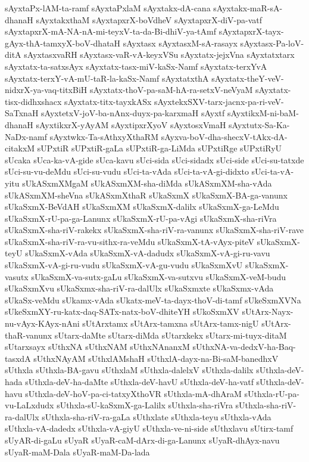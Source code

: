 {sAyxtaPx-lAM-ta-ramf
sAyxtaPxlaM
sAyxtakx-dA-cana
sAyxtakx-maR-sA-dhanaH
sAyxtakxthaM
sAyxtapxrX-boVdheV
sAyxtapxrX-diV-pa-vatf
sAyxtapxrX-mA-NA-nA-mi-teyxV-ta-da-Bi-dhiV-ya-tAmf
sAyxtapxrX-tayx-gAyx-thA-tamxyX-boV-dhataH
sAyxtasx
sAyxtasxM-sA-rasayx
sAyxtasx-Pa-loV-ditA
sAyxtasxvaRH
sAyxtasx-vaR-vA-keyxVSu
sAyxtatx-jejxVna
sAyxtatxtarx
sAyxtatx-ta-satxsAyx
sAyxtatx-tasx-miV-kaSx-Namf
sAyxtatx-terxYvA
sAyxtatx-terxY-vA-mU-taR-la-kaSx-Namf
sAyxtatxthA
sAyxtatx-theY-veV-nidxrX-ya-vaq-titxBiH
sAyxtatx-thoV-pa-saM-hA-ra-setxV-neVyaM
sAyxtatx-tisx-didhxshacx
sAyxtatx-titx-tayxkASx
sAyxtekxSXV-tarx-jacnx-pa-ri-veV-SaTxnaH
sAyxtetxV-joV-ba-nAnx-duyx-pa-karxmaH
sAyxtf
sAyxtikxM-ni-baM-dhanaH
sAyxtikxrX-yAyAM
sAyxtipxrXyoV
sAyxtosxVmaH
sAyxtutx-Sa-Ka-NaDx-namf
sAyxtwkx-Ta-sAthxyXthaRM
sAyxva-boV-dha-shecxV-tAkx-dA-citakxM
sUPxtiR
sUPxtiR-gaLa
sUPxtiR-ga-LiMda
sUPxtiRge
sUPxtiRyU
sUcaka
sUca-ka-vA-gide
sUca-kavu
sUci-sida
sUci-sidadx
sUci-side
sUci-su-tatxde
sUci-su-vu-deMdu
sUci-su-vudu
sUci-ta-vAda
sUci-ta-vA-gi-didxto
sUci-ta-vA-yitu
sUkASxmXMgaM
sUkASxmXM-sha-diMda
sUkASxmXM-sha-vAda
sUkASxmXM-sheVna
sUkASxmXthaR
sUkaSxmX
sUkaSxmX-BA-ga-vanunx
sUkaSxmX-BeVdAH
sUkaSxmXM
sUkaSxmX-dalilx
sUkaSxmX-ga-LeMdu
sUkaSxmX-rU-pa-ga-Lanunx
sUkaSxmX-rU-pa-vAgi
sUkaSxmX-sha-riVra
sUkaSxmX-sha-riV-rakekx
sUkaSxmX-sha-riV-ra-vanunx
sUkaSxmX-sha-riV-rave
sUkaSxmX-sha-riV-ra-vu-sithx-ra-veMdu
sUkaSxmX-tA-vAyx-piteV
sUkaSxmX-teyU
sUkaSxmX-vAda
sUkaSxmX-vA-dadudx
sUkaSxmX-vA-gi-ru-vavu
sUkaSxmX-vA-gi-ru-vudu
sUkaSxmX-vA-gu-vudu
sUkaSxmXvU
sUkaSxmX-vasutx
sUkaSxmX-va-sutx-gaLu
sUkaSxmX-va-sutxvu
sUkaSxmX-veM-budu
sUkaSxmXvu
sUkaSxmx-sha-riV-ra-dalUlx
sUkaSxmxte
sUkaSxmx-vAda
sUkaSx-veMdu
sUkamx-vAda
sUkatx-meV-ta-dayx-thoV-di-tamf
sUkeSxmXVNa
sUkeSxmXY-ru-katx-daq-SATx-natx-boV-dhiteYH
sUkoSxmXV
sUtArx-Nayx-nu-vAyx-KAyx-nAni
sUtArxtamx
sUtArx-tamxna
sUtArx-tamx-nigU
sUtArx-thaR-vanunx
sUtarx-daMte
sUtarx-diMda
sUtarxkekx
sUtarx-mi-tuyx-ditaM
sUtarxsayx
sUthxNA
sUthxNAM
sUthxNAnanxM
sUthxNA-va-dedxV-ha-Baq-tasxdA
sUthxNAyAM
sUthxlAMshaH
sUthxlA-dayx-na-Bi-saM-banedhxV
sUthxla
sUthxla-BA-gavu
sUthxlaM
sUthxla-dalelxV
sUthxla-dalilx
sUthxla-deV-hada
sUthxla-deV-ha-daMte
sUthxla-deV-havU
sUthxla-deV-ha-vatf
sUthxla-deV-havu
sUthxla-deV-hoV-pa-ci-tatxyXthoVR
sUthxla-mA-dhAraM
sUthxla-rU-pa-vu-LaLxdudx
sUthxla-sU-kaSxmX-ga-Lalilx
sUthxla-sha-riVra
sUthxla-sha-riV-ra-dalUlx
sUthxla-sha-riV-ra-gaLa
sUthxlate
sUthxla-teyu
sUthxla-vAda
sUthxla-vA-dadedx
sUthxla-vA-giyU
sUthxla-ve-ni-side
sUthxlavu
sUtirx-tamf
sUyAR-di-gaLu
sUyaR
sUyaR-caM-dArx-di-ga-Lanunx
sUyaR-dhAyx-navu
sUyaR-maM-Dala
sUyaR-maM-Da-lada
}
